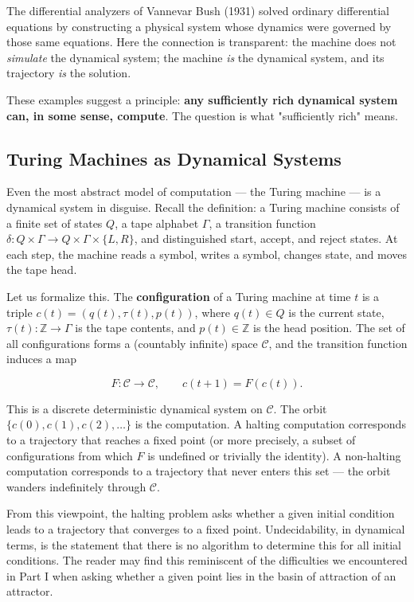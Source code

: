 The differential analyzers of Vannevar Bush (1931) solved ordinary differential equations by constructing a physical system whose dynamics were governed by those same equations. Here the connection is transparent: the machine does not \textit{simulate} the dynamical system; the machine \textit{is} the dynamical system, and its trajectory \textit{is} the solution.

These examples suggest a principle: \textbf{any sufficiently rich dynamical system can, in some sense, compute}. The question is what "sufficiently rich" means.

\subsection{Turing Machines as Dynamical Systems}\label{sec:13.1.2}

Even the most abstract model of computation --- the Turing machine --- is a dynamical system in disguise. Recall the definition: a Turing machine consists of a finite set of states $Q$, a tape alphabet $\Gamma$, a transition function $\delta: Q \times \Gamma \to Q \times \Gamma \times \{L, R\}$, and distinguished start, accept, and reject states. At each step, the machine reads a symbol, writes a symbol, changes state, and moves the tape head.

Let us formalize this. The \textbf{configuration} of a Turing machine at time $t$ is a triple $c(t) = (q(t), \tau(t), p(t))$, where $q(t) \in Q$ is the current state, $\tau(t): \mathbb{Z} \to \Gamma$ is the tape contents, and $p(t) \in \mathbb{Z}$ is the head position. The set of all configurations forms a (countably infinite) space $\mathcal{C}$, and the transition function induces a map

\[
F: \mathcal{C} \to \mathcal{C}, \qquad c(t+1) = F(c(t)).
\]

This is a discrete deterministic dynamical system on $\mathcal{C}$. The orbit $\{c(0), c(1), c(2), \ldots\}$ is the computation. A halting computation corresponds to a trajectory that reaches a fixed point (or more precisely, a subset of configurations from which $F$ is undefined or trivially the identity). A non-halting computation corresponds to a trajectory that never enters this set --- the orbit wanders indefinitely through $\mathcal{C}$.

From this viewpoint, the halting problem asks whether a given initial condition leads to a trajectory that converges to a fixed point. Undecidability, in dynamical terms, is the statement that there is no algorithm to determine this for all initial conditions. The reader may find this reminiscent of the difficulties we encountered in Part I when asking whether a given point lies in the basin of attraction of an attractor.

